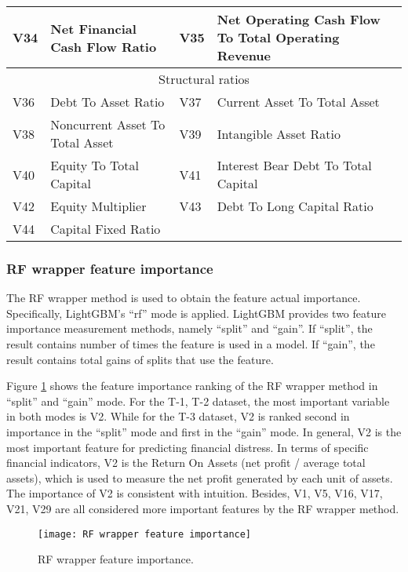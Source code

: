 \documentclass[review]{elsarticle}
\begin{document}
\begin{table}[H]
\begin{tabular}{llll}
    V34 & Net Financial Cash Flow Ratio & V35 & Net Operating Cash Flow To Total Operating Revenue \\ \hline
    \multicolumn{4}{c}{Structural ratios} \\ \hline
    V36 & Debt To Asset Ratio & V37 & Current Asset To Total Asset \\
    V38 & Noncurrent Asset To Total Asset & V39 & Intangible Asset Ratio \\
    V40 & Equity To Total Capital & V41 & Interest Bear Debt To Total Capital \\
    V42 & Equity Multiplier & V43 & Debt To Long Capital Ratio \\
    V44 & Capital Fixed Ratio &  &  \\ \hline
    \end{tabular}
\end{table}

\subsubsection{RF wrapper feature importance}
The RF wrapper method is used to obtain the feature actual importance. Specifically, LightGBM’s ``rf'' mode is applied. LightGBM provides two feature importance measurement methods, namely ``split'' and ``gain''. If ``split'', the result contains number of times the feature is used in a model. If ``gain'', the result contains total gains of splits that use the feature.

Figure \ref{fig: RF Wrapper Feature Importance} shows the feature importance ranking of the RF wrapper method in ``split'' and ``gain'' mode. For the T-1, T-2 dataset, the most important variable in both modes is V2. While for the T-3 dataset, V2 is ranked second in importance in the ``split'' mode and first in the ``gain'' mode. In general, V2 is the most important feature for predicting financial distress. In terms of specific financial indicators, V2 is the Return On Assets (net profit / average total assets), which is used to measure the net profit generated by each unit of assets. The importance of V2 is consistent with intuition. Besides, V1, V5, V16, V17, V21, V29 are all considered more important features by the RF wrapper method.

\begin{figure}[H]
    \centering
    \texttt{[image: RF wrapper feature importance]}
    \caption{RF wrapper feature importance.}
    \label{fig: RF Wrapper Feature Importance}
\end{figure}
\end{document}
